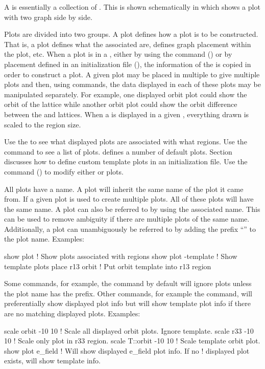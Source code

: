 {{A  is essentially a collection of . This is shown schematically in
 which shows a plot with two graph side by side.

Plots are divided into two groups. A  plot defines how a  plot is to be
constructed. That is, a  plot defines what the associated  are, defines
graph placement within the plot, etc. When a  plot is  in a ,
either by using the  command () or by placement defined in an initialization
file (), the information of the  is copied in order to construct a
 plot. A given  plot may be placed in multiple  to give
multiple  plots and then, using  commands, the data displayed in each of these
plots may be manipulated separately. For example, one displayed orbit plot could show the orbit of
the  lattice while another orbit plot could show the orbit difference between the
 and  lattices. When a  is displayed in a given ,
everything drawn is scaled to the region size.

Use the  to see what displayed plots are associated with what regions. Use the
 command to see a list of  plots. \tao defines a number of
default  plots. Section~ discusses how to define custom template
plots in an initialization file. Use the  command () to modify either
 or  plots.

All plots have a name. A  plot will inherit the same name of the  plot it
came from. If a given  plot is used to create multiple  plots. All of
these plots will have the same name. A  plot can also be referred to by using the
associated  name. This can be used to remove ambiguity if there are multiple
 plots of the same name. Additionally, a  plot can unambiguously be
referred to by adding the prefix ``'' to the plot name. Examples:
\begin{example}
  show plot           ! Show plots associated with regions
  show plot -template ! Show template plots
  place r13 orbit     ! Put orbit template into r13 region
\end{example}

Some commands, for example, the  command by default will ignore  plots unless
the plot name has the  prefix. Other commands, for example the  command, will
preferentially show displayed plot info but will show template plot info if there are no matching
displayed plots. Examples:
\begin{example}
  scale orbit -10 10    ! Scale all displayed orbit plots. Ignore template.
  scale r33 -10 10      ! Scale only plot in r33 region.
  scale T::orbit -10 10 ! Scale template orbit plot.
  show plot e_field     ! Will show displayed e_field plot info. If no
                        ! displayed plot exists, will show template info.
\end{example}

}}
